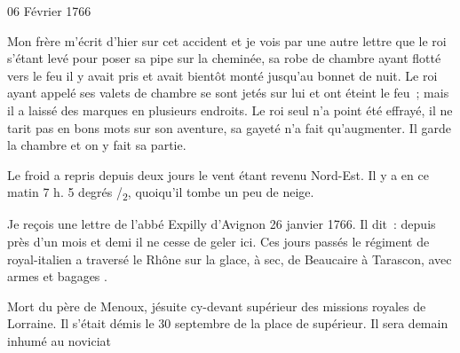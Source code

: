                      \begin{diary}{06 Février 1766}{}
                        
                        
                           Mon frère m'écrit d'hier sur cet accident
                           et je vois par une autre lettre que le roi s'étant
                           levé pour poser sa pipe sur la cheminée, sa
                           robe de chambre ayant flotté vers le feu il
                           y avait pris et avait bientôt monté jusqu'au
                           bonnet de nuit. Le roi
                           ayant
                           appelé ses
                           valets de chambre se sont jetés sur lui et
                           ont éteint le feu ; mais il a laissé des
                           marques en plusieurs endroits. Le
                              roi seul
                           n'a point été effrayé, il ne tarit pas en
                           bons mots sur son aventure, sa gayeté
                           n'a fait qu'augmenter. Il garde la chambre
                           et on y fait sa partie. \bigskip
        
        
                         Le froid a repris depuis deux jours le
                           vent étant revenu Nord-Est. Il y a
                           en ce matin 7
                              h.
                           5 degrés
                              /\textsubscript{2}, quoiqu'il tombe un peu de neige. \bigskip
        
        
                         Je reçois une lettre de l'abbé Expilly
                           d'Avignon
                           26 janvier 1766. Il dit :
                           \og depuis près d'un mois et demi il ne cesse
                              de geler ici. Ces jours passés le régiment
                                 de royal-italien a traversé le
                                 Rhône sur
                              la glace, à sec, de Beaucaire à Tarascon,
                              avec armes et bagages \fg{}. \bigskip
        
        
                         Mort du père de Menoux, jésuite cy-devant
                           supérieur des missions royales de Lorraine.
                           Il s'était démis le
                                 30 septembre de la place de supérieur.
                           Il sera demain inhumé au
                              noviciat
                        \bigskip
        
        
                     \end{diary}


